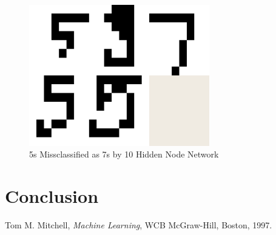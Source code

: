 \documentclass{article}
\begin{document}
\begin{figure}
\centering
\includegraphics[width=0.7\textwidth]{data/final/10_test_5missclass7.png}
\caption{5s Missclassified as 7s by 10 Hidden Node Network}
\label{10_5missclass7}
\end{figure}

\section{Conclusion}\label{conclusion}

\begin{thebibliography}{9}

  Tom M. Mitchell,
  \emph{Machine Learning},
  WCB McGraw-Hill, Boston,
  1997.

\end{thebibliography}
\end{document}
